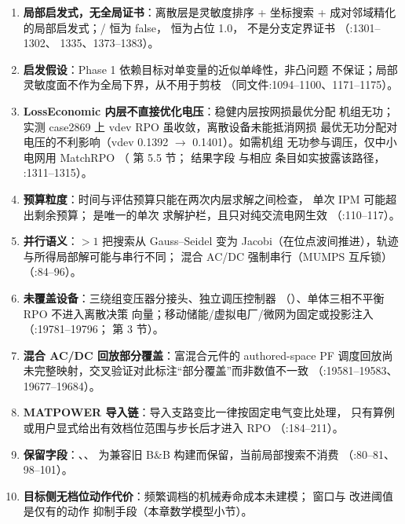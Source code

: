 \begin{enumerate}
  \item \textbf{局部启发式，无全局证书}：离散层是灵敏度排序 + 坐标搜索 +
        成对邻域精化的局部启发式；/
         恒为 false， 恒为占位
        1.0， 不是分支定界证书
        （:1301--1302、
        1335、1373--1383）。
  \item \textbf{启发假设}：Phase 1 依赖目标对单变量的近似单峰性，非凸问题
        不保证；局部灵敏度面不作为全局下界，从不用于剪枝
        （同文件:1094--1100、1171--1175）。
  \item \textbf{LossEconomic 内层不直接优化电压}：稳健内层按网损最优分配
        机组无功；实测 case2869 上 vdev RPO 虽收敛，离散设备未能抵消网损
        最优无功分配对电压的不利影响（vdev 0.1392 $\to$ 0.1401）。如需机组
        无功参与调压，仅中小电网用 MatchRPO
        （ 第 5.5 节；
        结果字段  与相应
         条目如实披露该路径，
        :1311--1315）。
  \item \textbf{预算粒度}：时间与评估预算只能在两次内层求解之间检查，
        单次 IPM 可能超出剩余预算； 是唯一的单次
        求解护栏，且只对纯交流电网生效
        （:110--117）。
  \item \textbf{并行语义}：$>1$ 把搜索从 Gauss--Seidel
        变为 Jacobi（在位点波间推进），轨迹与所得局部解可能与串行不同；
        混合 AC/DC 强制串行（MUMPS 互斥锁）
        （:84--96）。
  \item \textbf{未覆盖设备}：三绕组变压器分接头、独立调压控制器
        （）、单体三相不平衡 RPO 不进入离散决策
        向量；移动储能/虚拟电厂/微网为固定或投影注入
        （:19781--19796；
         第 3 节）。
  \item \textbf{混合 AC/DC 回放部分覆盖}：富混合元件的 authored-space PF
        调度回放尚未完整映射，交叉验证对此标注“部分覆盖”而非数值不一致
        （:19581--19583、19677--19684）。
  \item \textbf{MATPOWER 导入链}：导入支路变比一律按固定电气变比处理，
        只有算例或用户显式给出有效档位范围与步长后才进入 RPO
        （:184--211）。
  \item \textbf{保留字段}：、、
        为兼容旧 B\&B 构建而保留，当前局部搜索不消费
        （:80--81、
        98--101）。
  \item \textbf{目标侧无档位动作代价}：频繁调档的机械寿命成本未建模；
         窗口与  改进阈值是仅有的动作
        抑制手段（本章数学模型小节）。
\end{enumerate}
